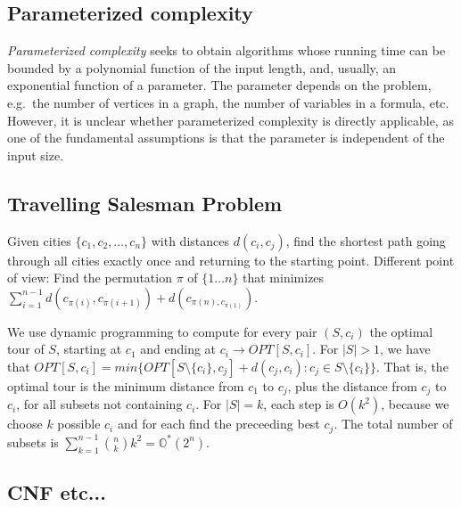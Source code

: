 \subsection{Parameterized complexity}
\textit{Parameterized complexity} seeks to obtain algorithms whose running time can be bounded
by a polynomial function of the input length, and, usually, an exponential function of a parameter.
The parameter depends on the problem, e.g.\ the number of vertices in a graph, the number of variables
in a formula, etc. However, it is unclear whether parameterized complexity is directly applicable, as one
of the fundamental assumptions is that the parameter is independent of the input size.

\subsection{Travelling Salesman Problem}
Given cities $\{c_1,c_2,\hdots, c_n\}$ with distances $d(c_i,c_j)$, find the shortest path
going through all cities exactly once and returning to the starting point. Different point of view:
Find the permutation $\pi$ of $\{1 \hdots n\}$ that minimizes 
$\sum_{i=1}^{n-1} d(c_{\pi(i)}, c_{\pi(i+1)}) + d(c_{\pi(n), c_{\pi(1)}})$.

We use dynamic programming to compute for every pair $(S, c_i)$ the optimal tour of $S$, starting
at $c_1$ and ending at $c_i \rightarrow OPT[S,c_i]$. For $|S| > 1$, we have that
$OPT[S,c_i] = min\{OPT[S\setminus\{c_i\}, c_j] + d(c_j,c_i): c_j \in S\setminus \{c_i\}\}$. That is, the
optimal tour is the minimum distance from $c_1$ to $c_j$, plus the distance from $c_j$ to $c_i$,
for all subsets not containing $c_i$. For $|S|=k$, each step is $O(k^2)$, because we choose $k$ possible
$c_i$ and for each find the preceeding best $c_j$. The total number of subsets is
$\sum_{k=1}^{n-1} \binom{n}{k}k^2 = \mathbb{O}^*(2^n)$.

\subsection{CNF etc...}
